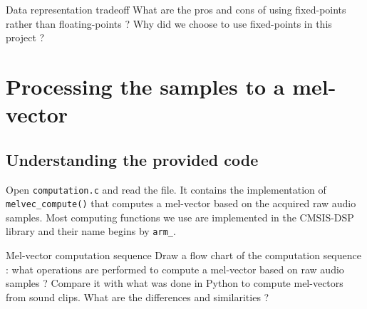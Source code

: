 \begin{bclogo}[couleur = gray!20, arrondi = 0.2, logo=\bcquestion]{Data representation tradeoff}
What are the pros and cons of using fixed-points rather than floating-points ? Why did we choose to use fixed-points in this project ?
\end{bclogo}

\section{Processing the samples to a mel-vector}

\subsection{Understanding the provided code}

Open \texttt{computation.c} and read the file. It contains the implementation of \texttt{melvec\_compute()} that computes a mel-vector based on the acquired raw audio samples. Most computing functions we use are implemented in the CMSIS-DSP library and their name begins by \texttt{arm\_}.

\begin{bclogo}[couleur = gray!20, arrondi = 0.2, logo=\bcquestion]{Mel-vector computation sequence}
Draw a flow chart of the computation sequence : what operations are performed to compute a mel-vector based on raw audio samples ? Compare it with what was done in Python to compute mel-vectors from sound clips. What are the differences and similarities ?
\end{bclogo}

